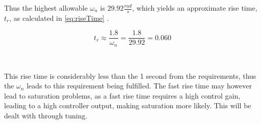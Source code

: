 Thus the highest allowable $\omega_n$ is $29.92 \frac{rad}{s}$, which yields an approximate rise time, $t_r$, as calculated in \autoref{eq:riseTime} \citep[p. 152]{sou:Feedback}.

\begin{equation}\label{eq:riseTime}
t_r \approx \frac{1.8}{\omega_n} = \frac{1.8}{29.92} = 0.060
\end{equation}
\begin{where}
\\
\end{where}

This rise time is considerably less than the 1 second from the requirements, thus the $\omega_n$ leads to this requirement being fulfilled. The fast rise time may however lead to saturation problems, as a fast rise time requires a high control gain, leading to a high controller output, making saturation more likely. This will be dealt with through tuning.

